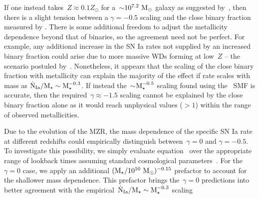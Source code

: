 \documentclass[ms.tex]{subfiles}
\begin{document}
If one instead takes~$Z \approx 0.1Z_\odot$ for a~$\sim$$10^{7.2}~\text{M}_\odot$ galaxy
as suggested by~\citet{Andrews2013}, then there is a slight tension between a
$\gamma = -0.5$ scaling and the close binary fraction measured by
\citet{Moe2019}.
There is some additional freedom to adjust the metallicity dependence beyond
that of binaries, so the agreement need not be perfect.
For example, any additional increase in the SN Ia rates not supplied by an
increased binary fraction could arise due to more massive WDs forming at
low~$Z$ -- the scenario postuled by~\citet{Kistler2013}.
Nonetheless, it appears that the scaling of the close binary fraction with
metallicity can explain the majority of the effect if rate scales with mass as
$\dot{\text{N}}_\text{Ia} / \text{M}_\star \sim \text{M}_\star^{-0.3}$.
If instead the~$\sim$$\text{M}_\star^{-0.5}$ scaling found using the~\citet{Bell2003}
SMF is accurate, then the required~$\gamma \approx -1.5$ scaling cannot be
explained by the close binary fraction alone as it would reach unphysical
values ($>1$) within the range of observed metallicities.
\par
Due to the evolution of the MZR, the mass dependence of the specific SN Ia rate
at different redshifts could empirically distinguish between~$\gamma = 0$ and
$\gamma = -0.5$.
To investigate this possibility, we simply evaluate equation~
over the appropriate range of lookback times assuming standard cosmological
parameters~\citep{Planck2014}.
For the~$\gamma = 0$ case, we apply an additional
$(\text{M}_\star / 10^{10}~\text{M}_\odot)^{-0.15}$ prefactor to account for the shallower mass
dependence.
This prefactor brings the~$\gamma = 0$ predictions into better agreement with
the empirical~$\dot{\text{N}}_\text{Ia} / \text{M}_\star \sim \text{M}_\star^{-0.3}$ scaling
\end{document}
